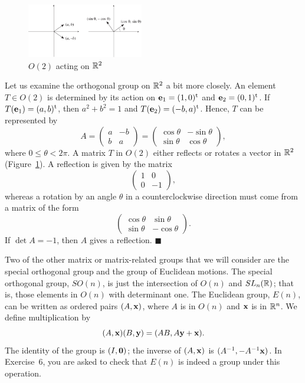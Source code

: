  
\vspace{1.5ex}
 
 
\begin{figure}[htb]
\begin{center}
\centerline {
\includegraphics[width=2in]{O2}
}
\end{center}
\caption{$O(2)$ acting on ${\Bbb R}^2$}
\label{O2}
\end{figure}
 
 
Let us examine the orthogonal group  on ${\Bbb R}^2$ a bit more
closely.  An element $T \in O(2)$ is determined by its action on
${\bold e}_1 = (1, 0)^{\rm t}$ and ${\bold e}_2 = (0, 1)^{\rm t}$. If
$T({\bold e}_1) = (a,b)^{\rm t}$, then $a^2 + b^2 = 1$ and $T({\bold
e}_2) = (-b, a)^{\rm t}$. Hence, $T$ can be represented by 
\[
A
=
\left(
\begin{array}{cc}
a & -b \\
b & a
\end{array}
\right)
=
\left(
\begin{array}{cc}
\cos \theta & - \sin \theta \\
\sin \theta & \cos \theta
\end{array}
\right),
\]
where $0 \leq \theta < 2 \pi$. A matrix $T$ in $O(2)$ either reflects
or rotates a vector in ${\Bbb R}^2$ (Figure~\ref{O2}). A reflection is
given by the matrix 
\[
\left(
\begin{array}{cc}
1 & 0 \\
0 & -1
\end{array}
\right),
\]
whereas a rotation by an angle $\theta$ in a counterclockwise direction
must come from a matrix of the form 
\[
\left(
\begin{array}{cc}
\cos \theta & \sin \theta \\
\sin \theta & -\cos \theta
\end{array}
\right).
\]
If $\det A =-1$, then $A$ gives a reflection.
\hspace{\fill} $\blacksquare$
 
 
\vspace{1.5ex}
 
 
Two of the other matrix or matrix-related groups that we will consider
are the special orthogonal group  and the group of Euclidean motions.
The {\bfi special orthogonal group},
$SO(n)$\label{notespecialorthog}, is just the intersection of $O(n)$
and $SL_n({\Bbb R})$; that is, those elements in $O(n)$ with determinant
one. The {\bfi Euclidean
group},
$E(n)$\label{noteeuclidgroup}, can be written as ordered pairs $(A,
{\bold x})$, where $A$ is in $O(n)$ and ${\bold x}$ is in ${\Bbb
R}^n$. We define multiplication by
\[
(A, {\bold x}) (B, {\bold y})
=
(AB, A {\bold y} +{\bold x}).
\]
The identity of the group is $(I,{\bold 0})$; the inverse of $(A,
{\bold x})$ is $(A^{-1}, -A^{-1} {\bold x})$. In Exercise~6, you 
are asked to check that $E(n)$ is indeed a group under this operation.
 

